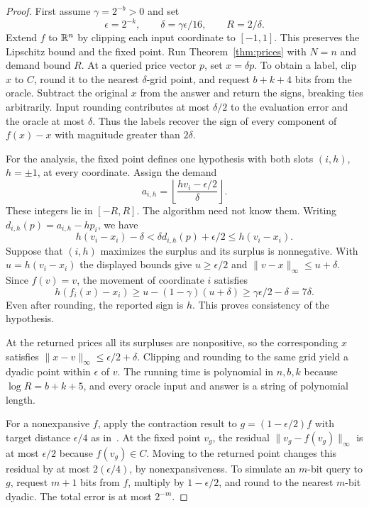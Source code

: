\begin{proof}
First assume \(\gamma=2^{-b}>0\) and set
\[
 \epsilon=2^{-k},\qquad \delta=\gamma\epsilon/16,\qquad R=2/\delta .
\]
Extend \(f\) to \(\mathbb R^n\) by clipping each input coordinate to
\([-1,1]\). This preserves the Lipschitz bound and the fixed point.
Run Theorem~\ref{thm:prices} with \(N=n\) and demand bound \(R\).
At a queried price vector \(p\), set \(x=\delta p\).
To obtain a label, clip \(x\) to \(C\), round it to the nearest
\(\delta\)-grid point, and request \(b+k+4\) bits from the oracle.
Subtract the original \(x\) from the answer and return the signs,
breaking ties arbitrarily. Input rounding contributes at most
\(\delta/2\) to the evaluation error and the oracle at most
\(\delta\). Thus the labels recover the sign of every component of
\(f(x)-x\) with magnitude greater than \(2\delta\).

For the analysis, the fixed point defines one hypothesis with both
slots \((i,h)\), \(h=\pm1\), at every coordinate. Assign the demand
\[
 a_{i,h}=\left\lfloor\frac{h v_i-\epsilon/2}{\delta}\right\rfloor.
\]
These integers lie in \([-R,R]\). The algorithm need not know them.
Writing \(d_{i,h}(p)=a_{i,h}-hp_i\), we have
\[
 h(v_i-x_i)-\delta
 <\delta d_{i,h}(p)+\epsilon/2
 \le h(v_i-x_i).
\]
Suppose that \((i,h)\) maximizes the surplus and its surplus is
nonnegative. With \(u=h(v_i-x_i)\) the displayed bounds give
\(u\ge\epsilon/2\) and \(\|v-x\|_\infty\le u+\delta\).
Since \(f(v)=v\), the movement of coordinate \(i\) satisfies
\[
 h(f_i(x)-x_i)\ge u-(1-\gamma)(u+\delta)
     \ge \gamma\epsilon/2-\delta=7\delta .
\]
Even after rounding, the reported sign is \(h\).
This proves consistency of the hypothesis.

At the returned prices all its surpluses are nonpositive, so the
corresponding \(x\) satisfies
\(\|x-v\|_\infty\le\epsilon/2+\delta\). Clipping and rounding to
the same grid yield a dyadic point within \(\epsilon\) of \(v\).
The running time is polynomial in \(n,b,k\) because
\(\log R=b+k+5\), and every oracle input and answer is a string
of polynomial length.

For a nonexpansive \(f\), apply the contraction result to
\(g=(1-\epsilon/2)f\) with target distance \(\epsilon/4\)
as in~\cite{CLY,SF}. At the fixed point \(v_g\), the residual
\(\|v_g-f(v_g)\|_\infty\) is at most \(\epsilon/2\) because
\(f(v_g)\in C\). Moving to the returned point changes this residual
by at most \(2(\epsilon/4)\), by nonexpansiveness. To simulate an
\(m\)-bit query to \(g\), request \(m+1\) bits from \(f\),
multiply by \(1-\epsilon/2\), and round to the nearest \(m\)-bit
dyadic. The total error is at most \(2^{-m}\).
\end{proof}

